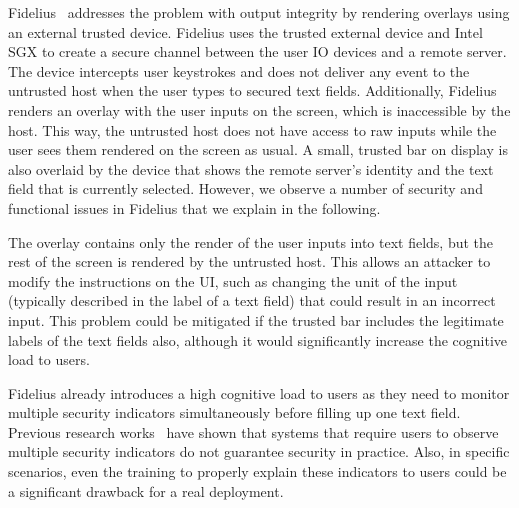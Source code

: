 Fidelius~\cite{Fidelius} addresses the problem with output integrity by rendering overlays using an external trusted device. Fidelius uses the trusted external device and Intel SGX to create a secure channel between the user IO devices and a remote server. The device intercepts user keystrokes and does not deliver any event to the untrusted host when the user types to secured text fields. Additionally, Fidelius renders an overlay with the user inputs on the screen, which is inaccessible by the host. This way, the untrusted host does not have access to raw inputs while the user sees them rendered on the screen as usual.
A small, trusted bar on display is also overlaid by the device that shows the remote server's identity and the text field that is currently selected. 
However, we observe a number of security and functional issues in Fidelius that we explain in the following. 

The overlay contains only the render of the user inputs into text fields, but the rest of the screen is rendered by the untrusted host.
This allows an attacker to modify the instructions on the UI, such as changing the unit of the input (typically described in the label of a text field) that could result in an incorrect input. This problem could be mitigated if the trusted bar includes the legitimate labels of the text fields also, although it would significantly increase the cognitive load to users.

Fidelius already introduces a high cognitive load to users as they need to monitor multiple security indicators simultaneously before filling up one text field. Previous research works~\cite{egelman2008you,sobey2008exploring, anderson2016warning} have shown that systems that require users to observe multiple security indicators %
do not guarantee security in practice.
Also, in specific scenarios, even the training to properly explain these indicators to users could be a significant drawback for a real deployment.


